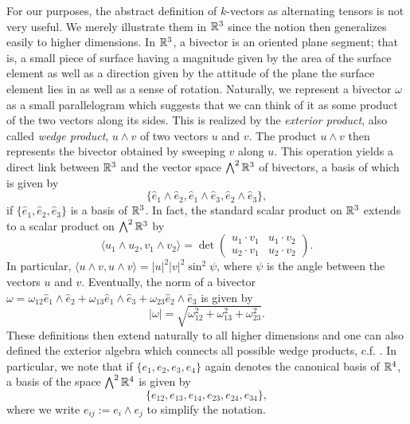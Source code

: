For our purposes, the abstract definition of $k$-vectors as alternating tensors is not very useful. We merely illustrate them in $\mathbb{R}^3$ since the notion then generalizes easily to higher dimensions. In $\mathbb{R}^3$, a bivector is an oriented plane segment; that is, a small piece of surface having a magnitude given by the area of the surface element as well as a direction given by the attitude of the plane the surface element lies in as well as a sense of rotation. Naturally, we represent a bivector $\omega$ as a small parallelogram which suggests that we can think of it as some product of the two vectors along its sides. This is realized by the \emph{exterior product}, also called \emph{wedge product}, $u \wedge v$ of two vectors $u$ and $v$. The product $u \wedge v$ then represents the bivector obtained by sweeping $v$ along $u$. This operation yields a direct link between $\mathbb{R}^3$ and the vector space $\bigwedge^2 \mathbb{R}^3$ of bivectors, a basis of which is given by
\begin{equation}
 \{\hat{e}_1 \wedge \hat{e}_2, \hat{e}_1 \wedge \hat{e}_3, \hat{e}_2 \wedge \hat{e}_3\},
\end{equation}
if $\{\hat{e}_1, \hat{e}_2, \hat{e}_3\}$ is a basis of $\mathbb{R}^3$. In fact, the standard scalar product on $\mathbb{R}^3$ extends to a scalar product on $\bigwedge^2 \mathbb{R}^3$ by
\begin{equation}
\langle u_1 \wedge u_2 , v_1 \wedge v_2 \rangle = \det \left (\begin{array}{cc}
u_1 \cdot v_1 & u_1 \cdot v_2 \\ 
u_2 \cdot v_1 & u_2 \cdot v_2
\end{array}  \right).
\end{equation}
In particular, $\langle u \wedge v, u \wedge v \rangle = |u|^2 |v|^2 \sin^2\psi$, where $\psi$ is the angle between the vectors $u$ and $v$. Eventually, the norm of a bivector $\omega = \omega_{12} \hat{e}_1 \wedge \hat{e}_2 + \omega_{13} \hat{e}_1 \wedge \hat{e}_3 + \omega_{23} \hat{e}_2 \wedge \hat{e}_3$ is given by
\begin{equation}
|\omega| = \sqrt{\omega_{12}^2 + \omega_{13}^2 + \omega_{23}^2}.
\end{equation}
These definitions then extend naturally to all higher dimensions and one can also defined the exterior algebra which connects all possible wedge products, c.f. \cite{Lounesto2006}. In particular, we note that if $\{e_1, e_2, e_3, e_4\}$ again denotes the canonical basis of $\mathbb{R}^4$, a basis of the space $\bigwedge^2 \mathbb{R}^4$ is given by
\begin{equation}
\{e_{12}, e_{13}, e_{14}, e_{23}, e_{24}, e_{34}\},
\end{equation}
where we write $e_{ij} := e_i \wedge e_j$ to simplify the notation.

